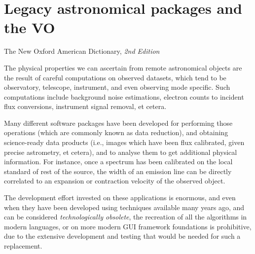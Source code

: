 
\chapter[Legacy astronomical packages and the VO]
{Legacy astronomical packages and the VO}
\label{cha:using_legacy_tools}
	{The New  Oxford American Dictionary, \emph{2nd Edition}}
	
	The physical properties we can ascertain from remote
	astronomical objects are the result of careful computations on
	observed datasets, which tend to be observatory, telescope,
	instrument, and even observing mode specific. Such computations
	include background noise estimations, electron counts to
	incident flux conversions, instrument signal removal, et
	cetera.

	Many different software packages have been developed for
	performing those operations (which are commonly known as data
	reduction), and obtaining science-ready data products (i.e.,
	images which have been flux calibrated, given precise
	astrometry, et cetera), and to analyse them to get additional
	physical information. For instance, once a spectrum has been
	calibrated on the local standard of rest of the source,
	the width of an emission line can be directly correlated to
	an expansion or contraction velocity of the observed object.
	
	The development effort invested on these applications is
	enormous, and even when they have been developed using
	techniques available many years ago, and can be considered
	\emph{technologically obsolete}, the recreation of all the
	algorithms in modern languages, or on more modern GUI framework
	foundations is prohibitive, due to the extensive development
	and testing that would be needed for such a replacement.
	
